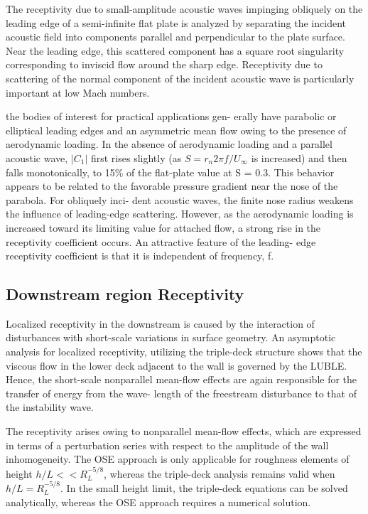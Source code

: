 \documentclass[twoside]{iitbreport}
\begin{document}
The receptivity due to small-amplitude acoustic waves impinging
obliquely on the leading edge of a semi-infinite flat plate is analyzed by
separating the incident acoustic field into components parallel and
perpendicular to the plate surface. Near the leading edge, this scattered
component has a square root singularity corresponding to inviscid flow
around the sharp edge. Receptivity due to scattering of the normal component
of the incident acoustic wave is particularly important at low Mach
numbers.

the bodies of interest for practical applications gen-
erally have parabolic or elliptical leading edges and an asymmetric mean flow
owing to the presence of aerodynamic loading. In the absence of aerodynamic loading and a parallel
acoustic wave, $|C_1 |$ first rises slightly (as $S = r_{n} 2 \pi f /
U_\infty$  is increased) and then falls monotonically, to 15\% of the
flat-plate value at S = 0.3. This behavior appears to be related
to the favorable pressure gradient near the nose of the parabola. For obliquely inci-
dent acoustic waves, the finite nose radius weakens the influence of leading-edge
scattering. However, as the aerodynamic
loading is increased toward its limiting value for attached flow, a strong rise in
the receptivity coefficient occurs. An attractive feature of the leading-
edge receptivity coefficient is that it is independent of frequency, f.

\subsection{Downstream region Receptivity }
Localized receptivity in the downstream is caused by the interaction of disturbances with short-scale
variations in surface geometry. An asymptotic analysis for localized receptivity,
utilizing the triple-deck structure shows that the viscous flow in the lower deck adjacent
to the wall is governed by the LUBLE. Hence, the short-scale nonparallel
mean-flow effects are again responsible for the transfer of energy from the wave-
length of the freestream disturbance to that of the instability wave.

The receptivity arises owing to nonparallel mean-flow effects, which
are expressed in terms of a perturbation series with respect to the amplitude of
the wall inhomogeneity. The OSE approach is only applicable for roughness elements of height
$h/L << R^{-5/8}_{L}$, whereas the triple-deck analysis remains valid when
$h/L = R^{-5/8}_{L}$. In the small height limit, the triple-deck equations can be solved
analytically, whereas the OSE approach requires a numerical solution.
\end{document}
